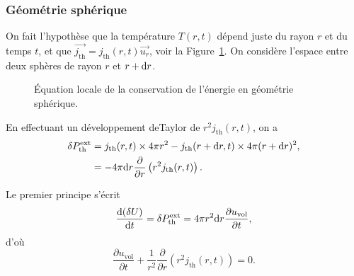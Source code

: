         \subsubsection{Géométrie sphérique}

            On fait l'hypothèse que la température $T(r,t)$ dépend juste du rayon $r$ et du temps $t$, et que $\vec{j_{\text{th}}}=j_{\text{th}}(r,t)\vec{u_r}$, voir la Figure~\ref{fig:equation_locale_conservation_energie_1d_spherique}. On considère l'espace entre deux sphères de rayon $r$ et $r+\mathrm{d} r$.
        
            \begin{figure}
                \centering
                \caption{Équation locale de la conservation de l'énergie en géométrie sphérique.}    
                \label{fig:equation_locale_conservation_energie_1d_spherique}
            \end{figure}

            En effectuant un développement deTaylor de $r^{2}j_{\text{th}}(r,t)$, on a 
            \begin{align*}
                \delta P_{\text{th}}^{\text{ext}}
                &=
                j_{\text{th}}(r,t)\times 4\pi r^{2}-j_{\text{th}}(r+\mathrm{d} r,t)\times4\pi(r+\mathrm{d} r)^{2},\\
                &=-4\pi\mathrm{d} r\frac{\partial}{\partial r}\left(r^{2}j_{\text{th}}(r,t)\right).
            \end{align*}

            Le premier principe s'écrit
            \begin{equation*}
                \frac{\mathrm{d}(\delta U)}{\mathrm{d} t}=\delta P_{\text{th}}^{\text{ext}}=4\pi r^{2}\mathrm{d} r\frac{\partial u_{\text{vol}}}{\partial t},
            \end{equation*}
            d'où
            \begin{equation*}
                \boxed{
                    \frac{\partial u_{\text{vol}}}{\partial t}+\frac{1}{r^{2}}\frac{\partial}{\partial r}\left(r^{2}j_{\text{th}}(r,t)\right)=0.
                }
            \end{equation*}

